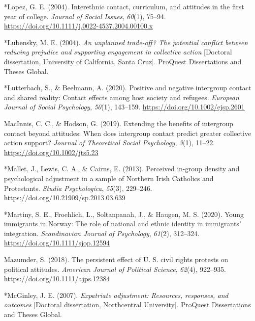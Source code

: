 \documentclass[12pt, letterpaper]{article}
\begin{document}
\leavevmode\hypertarget{ref-1042}{}%
*Lopez, G. E. (2004). Interethnic contact, curriculum, and attitudes in
the first year of college. \emph{Journal of Social Issues},
\emph{60}(1), 75--94.
\url{https://doi.org/10.1111/j.0022-4537.2004.00100.x}

\leavevmode\hypertarget{ref-894}{}%
*Lubensky, M. E. (2004). \emph{An unplanned trade-off? The potential
conflict between reducing prejudice and supporting engagement in
collective action} {[}Doctoral dissertation, University of California,
Santa Cruz{]}. ProQuest Dissertations and Theses Global.

\leavevmode\hypertarget{ref-4000}{}%
*Lutterbach, S., \& Beelmann, A. (2020). Positive and negative
intergroup contact and shared reality: Contact effects among host
society and refugees. \emph{European Journal of Social Psychology},
\emph{50}(1), 143--159. \url{https://doi.org/10.1002/ejsp.2601}

\leavevmode\hypertarget{ref-macinnis_extending_2019}{}%
MacInnis, C. C., \& Hodson, G. (2019). Extending the benefits of
intergroup contact beyond attitudes: When does intergroup contact
predict greater collective action support? \emph{Journal of Theoretical
Social Psychology}, \emph{3}(1), 11--22.
\url{https://doi.org/10.1002/jts5.23}

\leavevmode\hypertarget{ref-893}{}%
*Mallet, J., Lewis, C. A., \& Cairns, E. (2013). Perceived in-group
density and psychological adjustment in a sample of Northern Irish
Catholics and Protestants. \emph{Studia Psychologica}, \emph{55}(3),
229--246. \url{https://doi.org/10.21909/sp.2013.03.639}

\leavevmode\hypertarget{ref-3005}{}%
*Martiny, S. E., Froehlich, L., Soltanpanah, J., \& Haugen, M. S.
(2020). Young immigrants in Norway: The role of national and ethnic
identity in immigrants' integration. \emph{Scandinavian Journal of
Psychology}, \emph{61}(2), 312--324.
\url{https://doi.org/10.1111/sjop.12594}

\leavevmode\hypertarget{ref-mazumder_persistent_2018}{}%
Mazumder, S. (2018). The persistent effect of U. S. civil rights
protests on political attitudes. \emph{American Journal of Political
Science}, \emph{62}(4), 922--935.
\url{https://doi.org/10.1111/ajps.12384}

\leavevmode\hypertarget{ref-1850}{}%
*McGinley, J. E. (2007). \emph{Expatriate adjustment: Resources,
responses, and outcomes} {[}Doctoral dissertation, Northcentral
University{]}. ProQuest Dissertations and Theses Global.
\end{document}
